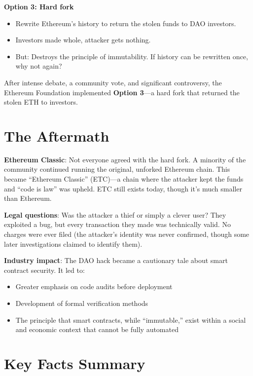 \documentclass[11pt]{article}
\begin{document}
\medskip
\noindent\textbf{Option 3: Hard fork}
\begin{itemize}[leftmargin=*]
\item Rewrite Ethereum's history to return the stolen funds to DAO investors.
\item Investors made whole, attacker gets nothing.
\item But: Destroys the principle of immutability. If history can be rewritten once, why not again?
\end{itemize}

\medskip
After intense debate, a community vote, and significant controversy, the Ethereum Foundation implemented \textbf{Option 3}---a hard fork that returned the stolen ETH to investors.

\section*{The Aftermath}

\textbf{Ethereum Classic}: Not everyone agreed with the hard fork. A minority of the community continued running the original, unforked Ethereum chain. This became ``Ethereum Classic'' (ETC)---a chain where the attacker kept the funds and ``code is law'' was upheld. ETC still exists today, though it's much smaller than Ethereum.

\medskip
\noindent\textbf{Legal questions}: Was the attacker a thief or simply a clever user? They exploited a bug, but every transaction they made was technically valid. No charges were ever filed (the attacker's identity was never confirmed, though some later investigations claimed to identify them).

\medskip
\noindent\textbf{Industry impact}: The DAO hack became a cautionary tale about smart contract security. It led to:
\begin{itemize}[leftmargin=*]
\item Greater emphasis on code audits before deployment
\item Development of formal verification methods
\item The principle that smart contracts, while ``immutable,'' exist within a social and economic context that cannot be fully automated
\end{itemize}

\section*{Key Facts Summary}
\end{document}
